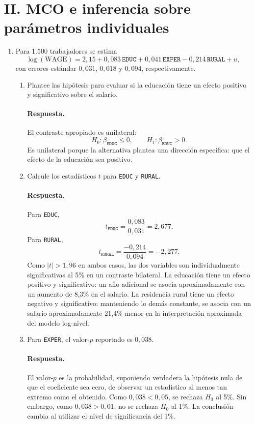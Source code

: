 \documentclass[letterpaper,11pt]{article}
\newcommand{\respuesta}{\color{blue}\paragraph{Respuesta.}}
\begin{document}
\section*{II. MCO e inferencia sobre parámetros individuales}

\begin{enumerate}[resume]

\item\color{black} Para 1.500 trabajadores se estima
\[
    \log(\text{WAGE})
    =2{,}15+0{,}083\,\texttt{EDUC}
    +0{,}041\,\texttt{EXPER}
    -0{,}214\,\texttt{RURAL}+u,
\]
con errores estándar $0{,}031$, $0{,}018$ y $0{,}094$, respectivamente.
\begin{enumerate}[label=(\alph*)]
    \item\color{black} Plantee las hipótesis para evaluar si la educación tiene un efecto
    positivo y significativo sobre el salario.

    \respuesta El contraste apropiado es unilateral:
    \[
        H_0:\beta_{\texttt{EDUC}}\leq 0,
        \qquad
        H_1:\beta_{\texttt{EDUC}}>0.
    \]
    Es unilateral porque la alternativa plantea una dirección específica:
    que el efecto de la educación sea positivo.

    \item\color{black} Calcule los estadísticos $t$ para \texttt{EDUC} y \texttt{RURAL}.

    \respuesta Para \texttt{EDUC},
    \[
        t_{\texttt{EDUC}}=\frac{0{,}083}{0{,}031}=2{,}677.
    \]
    Para \texttt{RURAL},
    \[
        t_{\texttt{RURAL}}=\frac{-0{,}214}{0{,}094}=-2{,}277.
    \]
    Como $|t|>1{,}96$ en ambos casos, las dos variables son
    individualmente significativas al 5\% en un contraste bilateral.
    La educación tiene un efecto positivo y significativo: un año adicional
    se asocia aproximadamente con un aumento de 8{,}3\% en el salario.
    La residencia rural tiene un efecto negativo y significativo:
    manteniendo lo demás constante, se asocia con un salario
    aproximadamente 21{,}4\% menor en la interpretación aproximada del
    modelo log-nivel.

    \item\color{black} Para \texttt{EXPER}, el valor-$p$ reportado es $0{,}038$.

    \respuesta El valor-$p$ es la probabilidad, suponiendo verdadera la
    hipótesis nula de que el coeficiente sea cero, de observar un estadístico
    al menos tan extremo como el obtenido. Como $0{,}038<0{,}05$, se rechaza
    $H_0$ al 5\%. Sin embargo, como $0{,}038>0{,}01$, no se rechaza $H_0$ al
    1\%. La conclusión cambia al utilizar el nivel de significancia del 1\%.
\end{enumerate}


\end{enumerate}
\end{document}
